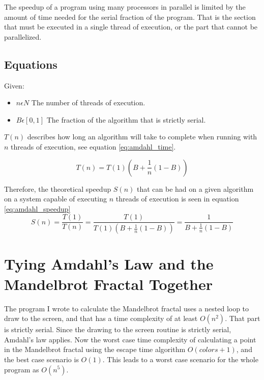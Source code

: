 \documentclass[10pt,oneside,letterpaper]{article}
\begin{document}
The speedup of a program using many processors in parallel is limited by the
amount of time needed for the serial fraction of the program. That is the
section that must be executed in a single thread of execution, or the part
that cannot be parallelized.

\subsection{Equations}
\label{sec:Amdahl-Equations}
Given:
\begin{itemize}
  \item $n \epsilon N$ The number of threads of execution.
  \item $B \epsilon [0,1]$ The fraction of the algorithm that is strictly serial.
\end{itemize}

$T(n)$ describes how long an algorithm will take to complete when running
with $n$ threads of execution, see equation \eqref{eq:amdahl_time}.

\begin{equation} \label{eq:amdahl_time}
    T(n) = T(1)(B + \frac{1}{n}(1-B))
\end{equation}

Therefore, the theoretical speedup $S(n)$ that can be had on a given algorithm
on a system capable of executing $n$ threads of execution is seen in equation
\eqref{eq:amdahl_speedup}
\begin{equation} \label{eq:amdahl_speedup}
    S(n) = \frac{T(1)}{T(n)}
         = \frac{T(1)}{T(1)(B+\frac{1}{n}(1-B))}
         = \frac{1}{B+\frac{1}{n}(1-B)}
\end{equation}

\section{Tying Amdahl's Law and the Mandelbrot Fractal Together}
The program I wrote to calculate the Mandelbrot fractal uses a nested loop to
draw to the screen, and that has a time complexity of at least $O(n^2)$. That
part is strictly serial. Since the drawing to the screen routine is strictly
serial, Amdahl's law applies. Now the worst case time complexity of calculating a
point in the Mandelbrot fractal using the escape time algorithm 
$O({colors} + 1)$, and the best case scenario is $O(1)$. This leads to a worst
case scenario for the whole program as $O(n^5)$.
\end{document}
